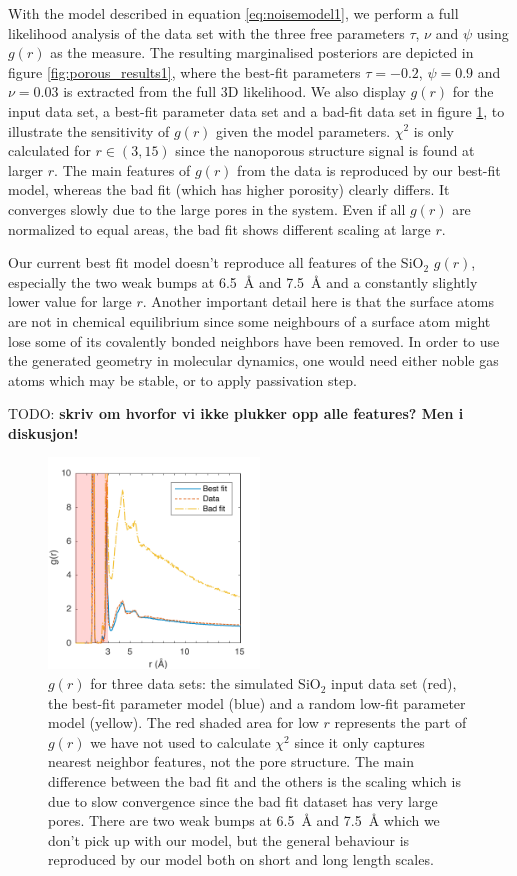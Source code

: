 \documentclass[aps,pre,twocolumn,letterpaper,floatfix,showpacs]{revtex4}
\newcommand{\todo}[1]{ {\color{Magenta} TODO: \color{Blue} \textbf{#1} }}
\begin{document}
With the model described in equation \ref{eq:noisemodel1}, we perform a full likelihood
analysis of the data set with the three free parameters $\tau$, $\nu$ and $\psi$ using $g(r)$ as the measure. 
The resulting marginalised posteriors are depicted in figure \ref{fig:porous_results1},
where the best-fit parameters $\tau=-0.2$, $\psi=0.9$ and $\nu=0.03$ is extracted from the full 3D likelihood. 
We also display $g(r)$ for the input data set, a best-fit parameter data set and a
bad-fit data set in figure \ref{fig:gofr1}, to illustrate the sensitivity of $g(r)$ given the model parameters.
$\chi^2$ is only calculated for $r\in (3,15)$ since the nanoporous structure signal is found at larger $r$.
The main features of $g(r)$ from the data is reproduced by our best-fit model, whereas the bad fit (which has higher porosity) clearly differs.
It converges slowly due to the large pores in the system. Even if all $g(r)$ are normalized to equal areas, the bad fit shows different scaling at large $r$.

Our current best fit model doesn't reproduce all features of the SiO$_2$ $g(r)$, especially the two weak bumps at \SI{6.5}{\angstrom} and \SI{7.5}{\angstrom} and a constantly slightly lower value for large $r$.
Another important detail here is that the surface atoms are not in chemical equilibrium since some neighbours of a surface atom might lose some of its covalently bonded neighbors have been removed. 
In order to use the generated geometry in molecular dynamics, one would need either noble gas atoms which may be stable, or to apply passivation step.

\todo{skriv om hvorfor vi ikke plukker opp alle features? Men i diskusjon!}

\begin{figure}
\includegraphics[width=0.5\textwidth]{gofr_figure.pdf}
\caption{$g(r)$ for three data sets: the simulated SiO$_2$ input data set (red), the best-fit parameter model (blue) and a random low-fit parameter model (yellow).
The red shaded area for low $r$ represents the part of $g(r)$ we have not used to calculate $\chi^2$ since it only captures nearest neighbor features, not the pore structure.
The main difference between the bad fit and the others is the scaling which is due to slow convergence since the bad fit dataset has very large pores.
There are two weak bumps at \SI{6.5}{\angstrom} and \SI{7.5}{\angstrom} which we don't pick up with our model, but the general behaviour is reproduced by our model both on short and long length scales.}
\label{fig:gofr1}
\end{figure}
\end{document}
